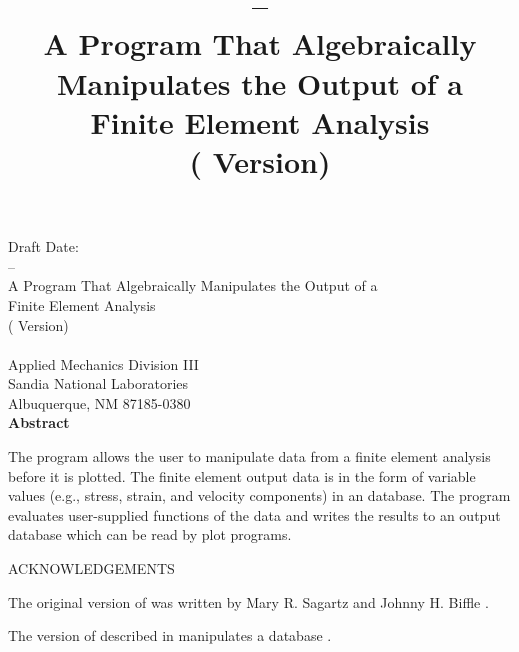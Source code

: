 \newif\ifdraft\drafttrue
\newif\ifsand\sandfalse

\SANDprintDate{\today}
\newcommand{\theTitle}{\caps{\PROGRAM} -- \\
A Program That Algebraically Manipulates the Output of a \\
Finite Element Analysis \\
(\exo{} Version)}
\title{\theTitle}
\ifsand
\pdfbookmark[1]{Cover}{cover}
\doCover
\newpage
\else
{}
\setcounter{page}{3}
\fi


\begin{center}
\ifdraft
Draft Date: \SANDprintDateVar\\
\else
Printed \SANDprintDateVar\\
\fi

\vspace{0.75in}
\theTitle\\
\vspace{0.75in}
\SANDauthorVar\\
Applied Mechanics Division III\\
Sandia National Laboratories\\
Albuquerque, NM 87185-0380\\
\vspace*{.5in}
\textbf{Abstract}
\end{center}
The \caps{\PROGRAM} program allows the user to manipulate data from a
finite element analysis before it is plotted. The finite element output
data is in the form of variable values (e.g., stress, strain, and
velocity components) in an \exo{} database. The \caps{\PROGRAM} program
evaluates user-supplied functions of the data and writes the results to
an output \exo{} database which can be read by plot programs.
\newpage
\begin{center} ACKNOWLEDGEMENTS \end{center}

The original version of \caps{\PROGRAM} was written by Mary R. Sagartz
and Johnny H. Biffle \cite{bib:oldalg}.

The version of \caps{\PROGRAM} described in \cite{bib:seaalg}
manipulates a  database \cite{bib:seaco}.
